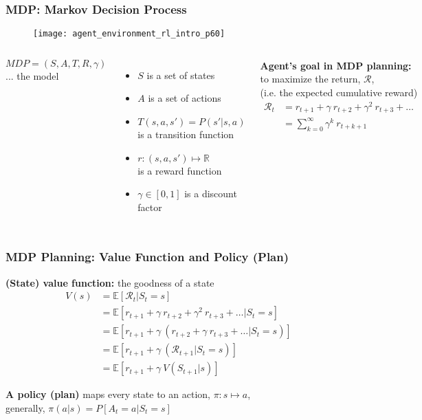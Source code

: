 \begin{frame}
\frametitle{MDP: Markov Decision Process}
\begin{figure}
    \centering
    \texttt{[image: agent\_environment\_rl\_intro\_p60]}
\end{figure}
\pause
\begin{columns}
    $MDP = (S, A, T, R, \gamma)$ ... the model \pause
    \begin{itemize}
      \item $S$ is a set of states
      \item $A$ is a set of actions \pause
      \item $T(s,a,s') = P(s'| s, a)$ \\ is a transition function \pause
      \item $r:(s,a,s') \mapsto \mathbb{R}$ \\ is a reward function \pause
      \item $\gamma \in [0,1]$ is a discount factor
    \end{itemize}
    \pause
    \textbf{Agent's goal in MDP planning:}\\
    to maximize the return, $\mathcal{R}$,\\
    (i.e. the expected cumulative reward) \\
    \begin{align*}
      \mathcal{R}_t & = r_{t+1} + \gamma~r_{t+2} + \gamma^2~r_{t+3} + \ldots  \\
      & = \sum_{k=0}^{\infty} \gamma^k~r_{t+k+1}
    \end{align*}
\end{columns}
\end{frame}

\begin{frame}
\frametitle{MDP Planning: Value Function and Policy (Plan)}
\textbf{(State) value function:} the goodness of a state
\begin{align*}
V(s) & = \mathbb{E}[\mathcal{R}_t | S_t = s] \\
& = \mathbb{E} [r_{t+1} + \gamma~r_{t+2} + \gamma^2~r_{t+3} + \ldots | S_t = s] \\
& = \mathbb{E} [r_{t+1} + \gamma~ (r_{t+2} + \gamma~r_{t+3} + \ldots | S_t = s)] \\
& = \mathbb{E} [r_{t+1} + \gamma~ (\mathcal{R}_{t+1} | S_t = s)] \\
& = \mathbb{E} [r_{t+1} + \gamma~V(S_{t+1}| s)]
\end{align*}
\pause

\textbf{A policy (plan)} maps every state to an action, $\pi: s \mapsto a$, \\
generally, $\pi (a|s) = P[A_t = a|S_t = s]$
\end{frame}

